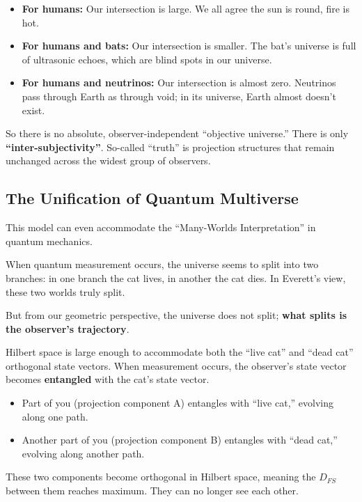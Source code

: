 \documentclass[11pt,a4paper,twoside]{book}
\begin{document}
\begin{itemize}
\item \textbf{For humans:} Our intersection is large. We all agree the sun is round, fire is hot.

\item \textbf{For humans and bats:} Our intersection is smaller. The bat's universe is full of ultrasonic echoes, which are blind spots in our universe.

\item \textbf{For humans and neutrinos:} Our intersection is almost zero. Neutrinos pass through Earth as through void; in its universe, Earth almost doesn't exist.
\end{itemize}

So there is no absolute, observer-independent ``objective universe.'' There is only \textbf{``inter-subjectivity''}. So-called ``truth'' is projection structures that remain unchanged across the widest group of observers.

\subsection{The Unification of Quantum Multiverse}

This model can even accommodate the ``Many-Worlds Interpretation'' in quantum mechanics.

When quantum measurement occurs, the universe seems to split into two branches: in one branch the cat lives, in another the cat dies. In Everett's view, these two worlds truly split.

But from our geometric perspective, the universe does not split; \textbf{what splits is the observer's trajectory}.

Hilbert space is large enough to accommodate both the ``live cat'' and ``dead cat'' orthogonal state vectors. When measurement occurs, the observer's state vector becomes \textbf{entangled} with the cat's state vector.

\begin{itemize}
\item Part of you (projection component A) entangles with ``live cat,'' evolving along one path.

\item Another part of you (projection component B) entangles with ``dead cat,'' evolving along another path.
\end{itemize}

These two components become orthogonal in Hilbert space, meaning the $D_{FS}$ between them reaches maximum. They can no longer see each other.
\end{document}
